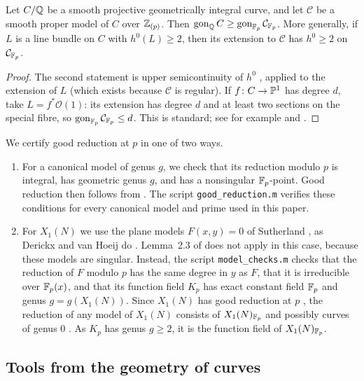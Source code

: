 \begin{lemma}[Specialization]\label{lem:specialization}
Let $C/\mathbb{Q}$ be a smooth projective geometrically integral curve, and let $\mathcal C$ be a smooth proper model
of $C$ over $\mathbb{Z}_{(p)}$. Then $\operatorname{gon}_{\mathbb{Q}} C\ge\operatorname{gon}_{\mathbb{F}_p}\mathcal C_{\mathbb{F}_p}$. More generally, if $L$ is a line
bundle on $C$ with $h^0(L)\ge2$, then its extension to $\mathcal C$ has $h^0\ge2$ on $\mathcal C_{\mathbb{F}_p}$.
\end{lemma}
\begin{proof}
The second statement is upper semicontinuity of $h^0$ \cite[III.12.8]{Hartshorne1977}, applied to the
extension of $L$ (which exists because $\mathcal C$ is regular). If $f\colon C\to\mathbb{P}^1$ has degree $d$, take
$L=f^*\mathcal O(1)$: its extension has degree $d$ and at least two sections on the special fibre, so
$\operatorname{gon}_{\mathbb{F}_p}\mathcal C_{\mathbb{F}_p}\le d$. This is standard; see for example \cite{Poonen2007} and \cite{NajmanOrlic2024}.
\end{proof}

We certify good reduction at $p$ in one of two ways.
\begin{enumerate}
\item For a canonical model of genus $g$, we check that its reduction modulo $p$ is integral, has geometric
 genus $g$, and has a nonsingular $\mathbb{F}_p$-point. Good reduction then follows from \cite[Lemma~2.3]{AKMJ2024}.
 The script \texttt{good\_reduction.m} verifies these conditions for every canonical model and prime used in
 this paper.
\item For $X_1(N)$ we use the plane models $F(x,y)=0$ of Sutherland \cite{SutherlandX1}, as Derickx and van Hoeij
 do \cite{DerickxVanHoeij2014}. Lemma~2.3 of \cite{AKMJ2024} does not apply in this case, because these models are singular.
 Instead, the script \texttt{model\_checks.m} checks that the reduction of $F$ modulo $p$ has the same degree in $y$ as $F$, that
 it is irreducible over $\mathbb{F}_p(x)$, and that its function field $K_p$ has exact constant field $\mathbb{F}_p$ and genus
 $g=g(X_1(N))$. Since $X_1(N)$ has good reduction at $p$ \cite{DeligneRapoport1973}, the reduction of any model
 of $X_1(N)$ consists of $X_1(N)_{\mathbb{F}_p}$ and possibly curves of genus $0$ \cite[\S8.3.4, \S9.2.1, \S9.3]{Liu2002}.
 As $K_p$ has genus $g\ge2$, it is the function field of $X_1(N)_{\mathbb{F}_p}$.
\end{enumerate}

\subsection{Tools from the geometry of curves}

